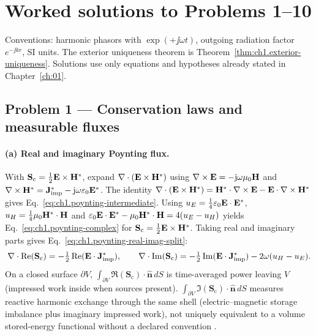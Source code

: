 \section{Worked solutions to Problems 1--10}
\label{sec:ch01.8-solutions}

\noindent Conventions: harmonic phasors with $\exp(+\jj\omega t)$, outgoing radiation factor $e^{-\jj kr}$, SI units. The exterior uniqueness theorem is Theorem~\ref{thm:ch1.exterior-uniqueness}. Solutions use only equations and hypotheses already stated in Chapter~\ref{ch:01}.

\subsection*{Problem 1 --- Conservation laws and measurable fluxes}

\paragraph{(a) Real and imaginary Poynting flux.}
With $\mathbf{S}_\mathrm{c}=\tfrac12\mathbf{E}\times\mathbf{H}^*$, expand $\nabla\cdot(\mathbf{E}\times\mathbf{H}^*)$ using $\nabla\times\mathbf{E}=-\mathrm{j}\omega\mu_0\mathbf{H}$ and $\nabla\times\mathbf{H}^*=\mathbf{J}_{\mathrm{imp}}^*-\mathrm{j}\omega\varepsilon_0\mathbf{E}^*$. The identity $\nabla\cdot(\mathbf{E}\times\mathbf{H}^*)=\mathbf{H}^*\cdot\nabla\times\mathbf{E}-\mathbf{E}\cdot\nabla\times\mathbf{H}^*$ gives Eq.~\eqref{eq:ch1.poynting-intermediate}. Using $u_E=\tfrac14\varepsilon_0\mathbf{E}\cdot\mathbf{E}^*$, $u_H=\tfrac14\mu_0\mathbf{H}^*\cdot\mathbf{H}$ and $\varepsilon_0\mathbf{E}\cdot\mathbf{E}^*-\mu_0\mathbf{H}^*\cdot\mathbf{H}=4(u_E-u_H)$ yields Eq.~\eqref{eq:ch1.poynting-complex} for $\mathbf{S}_\mathrm{c}=\tfrac12\mathbf{E}\times\mathbf{H}^*$. Taking real and imaginary parts gives Eq.~\eqref{eq:ch1.poynting-real-imag-split}:
\[
\nabla\cdot\Re(\mathbf{S}_\mathrm{c})=-\tfrac12\Re(\mathbf{E}\cdot\mathbf{J}_{\mathrm{imp}}^*),\qquad
\nabla\cdot\Im(\mathbf{S}_\mathrm{c})=-\tfrac12\Im(\mathbf{E}\cdot\mathbf{J}_{\mathrm{imp}}^*)-2\omega(u_H-u_E).
\]
On a closed surface $\partial V$, $\int_{\partial V}\Re(\mathbf{S}_\mathrm{c})\cdot\hat{\mathbf{n}}\,dS$ is time-averaged power leaving $V$ (impressed work inside when sources present). $\int_{\partial V}\Im(\mathbf{S}_\mathrm{c})\cdot\hat{\mathbf{n}}\,dS$ measures reactive harmonic exchange through the same shell (electric--magnetic storage imbalance plus imaginary impressed work), not uniquely equivalent to a volume stored-energy functional without a declared convention \cite{poynting1884,stratton1941}.

